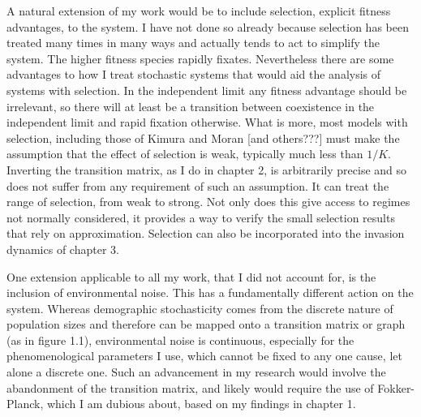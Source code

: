 A natural extension of my work would be to include selection, explicit fitness advantages, to the system. 
I have not done so already because selection has been treated many times in many ways \cite{a bunch???} and actually tends to act to simplify the system. 
The higher fitness species rapidly fixates. 
Nevertheless there are some advantages to how I treat stochastic systems that would aid the analysis of systems with selection. 
In the independent limit any fitness advantage should be irrelevant, so there will at least be a transition between coexistence in the independent limit and rapid fixation otherwise. 
What is more, most models with selection, including those of Kimura \cite{Kimura??} and Moran \cite{Moran with selection??} [and others???] must make the assumption that the effect of selection is weak, typically much less than $1/K$. 
Inverting the transition matrix, as I do in chapter 2, is arbitrarily precise and so does not suffer from any requirement of such an assumption. It can treat the range of selection, from weak to strong. 
Not only does this give access to regimes not normally considered, it provides a way to verify the small selection results that rely on approximation. 
Selection can also be incorporated into the invasion dynamics of chapter 3. 

One extension applicable to all my work, that I did not account for, is the inclusion of environmental noise. 
This has a fundamentally different action on the system. 
Whereas demographic stochasticity comes from the discrete nature of population sizes and therefore can be mapped onto a transition matrix or graph (as in figure 1.1),%
environmental noise is continuous, especially for the phenomenological parameters I use, which cannot be fixed to any one cause, let alone a discrete one. 
Such an advancement in my research would involve the abandonment of the transition matrix, and likely would require the use of Fokker-Planck, which I am dubious about, based on my findings in chapter 1. 


